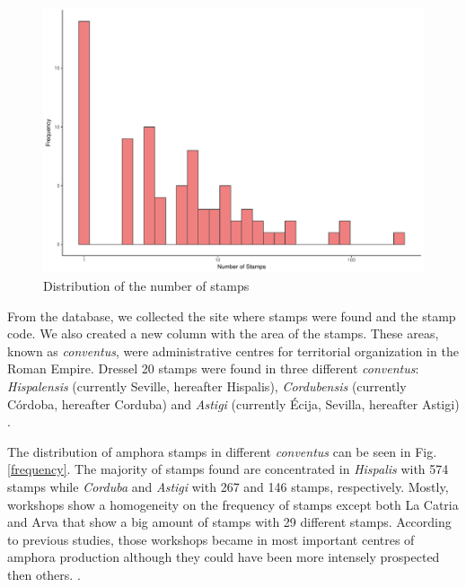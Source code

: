 \documentclass[review]{elsarticle}
\begin{document}
\begin{figure}[htp]
	\centering
\includegraphics[width=\linewidth]{figs/frequencystamp.pdf}
\caption{Distribution of the number of stamps}
\label{stamps}
\end{figure} 



From the database, we collected the site where stamps were found and the stamp code. We also created a new column with the area of the stamps. These areas, known as \textit{conventus}, were administrative centres for territorial organization in the Roman Empire. Dressel 20 stamps were found in three different \textit{conventus}: \textit{Hispalensis} (currently Seville, hereafter Hispalis), \textit{Cordubensis} (currently C\'ordoba, hereafter Corduba) and \textit{Astigi} (currently Écija, Sevilla, hereafter Astigi) \citep{rodriguez_economioleicola_1977,chic_datos_2001,berni_millet_epigrafianforica_2008} .

The distribution of amphora stamps in different \textit{conventus} can be seen in Fig. \ref{frequency}. The majority of stamps found are concentrated in \textit{Hispalis} with 574 stamps while \textit{Corduba} and \textit{Astigi} with 267 and 146 stamps, respectively. Mostly, workshops show a homogeneity on the frequency of stamps except both La Catria and Arva that show a big amount of stamps with 29 different stamps. According to previous studies, those workshops became in most important centres of amphora production although they could have been more intensely prospected then others. \citep{arva_1997}.
 
\end{document}
